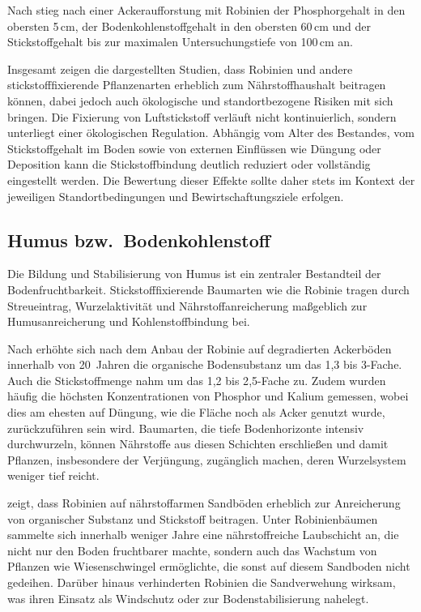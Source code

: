 \documentclass[twocolumn]{scrartcl}
\begin{document}
Nach \citet{kou2016robinieBoden} stieg nach einer Ackeraufforstung mit Robinien der Phosphorgehalt in den obersten 5\,cm, der Bodenkohlenstoffgehalt in den obersten 60\,cm und der Stickstoffgehalt bis zur maximalen Untersuchungstiefe von 100\,cm an.

Insgesamt zeigen die dargestellten Studien, dass Robinien und andere stickstofffixierende Pflanzenarten erheblich zum Nährstoffhaushalt beitragen können, dabei jedoch auch ökologische und standortbezogene Risiken mit sich bringen. Die Fixierung von Luftstickstoff verläuft nicht kontinuierlich, sondern unterliegt einer ökologischen Regulation. Abhängig vom Alter des Bestandes, vom Stickstoffgehalt im Boden sowie von externen Einflüssen wie Düngung oder Deposition kann die Stickstoffbindung deutlich reduziert oder vollständig eingestellt werden. Die Bewertung dieser Effekte sollte daher stets im Kontext der jeweiligen Standortbedingungen und Bewirtschaftungsziele erfolgen.


\subsection{Humus bzw.\ Bodenkohlenstoff}

Die Bildung und Stabilisierung von Humus ist ein zentraler Bestandteil der Bodenfruchtbarkeit. Stickstofffixierende Baumarten wie die Robinie tragen durch Streueintrag, Wurzelaktivität und Nährstoffanreicherung maßgeblich zur Humusanreicherung und Kohlenstoffbindung bei.

Nach \citet{papaioannou2016robinieBoden} erhöhte sich nach dem Anbau der Robinie auf degradierten Ackerböden innerhalb von 20~Jahren die organische Bodensubstanz um das 1{,}3 bis 3-Fache. Auch die Stickstoffmenge nahm um das 1{,}2 bis 2{,}5-Fache zu. Zudem wurden häufig die höchsten Konzentrationen von Phosphor und Kalium gemessen, wobei dies am ehesten auf Düngung, wie die Fläche noch als Acker genutzt wurde, zurückzuführen sein wird. Baumarten, die tiefe Bodenhorizonte intensiv durchwurzeln, können Nährstoffe aus diesen Schichten erschließen und damit Pflanzen, insbesondere der Verjüngung, zugänglich machen, deren Wurzelsystem weniger tief reicht.

\citet{gustafson1935robinie} zeigt, dass Robinien auf nährstoffarmen Sandböden erheblich zur Anreicherung von organischer Substanz und Stickstoff beitragen. Unter Robinienbäumen sammelte sich innerhalb weniger Jahre eine nährstoffreiche Laubschicht an, die nicht nur den Boden fruchtbarer machte, sondern auch das Wachstum von Pflanzen wie Wiesenschwingel ermöglichte, die sonst auf diesem Sandboden nicht gedeihen. Darüber hinaus verhinderten Robinien die Sandverwehung wirksam, was ihren Einsatz als Windschutz oder zur Bodenstabilisierung nahelegt.
\end{document}

